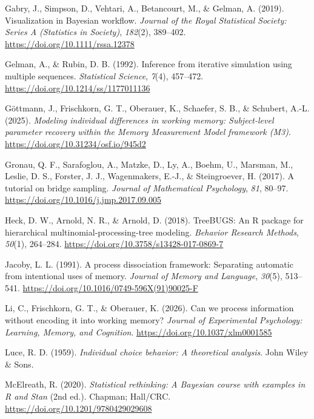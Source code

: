 \documentclass[
  man,
  floatsintext,
  longtable,
  nolmodern,
  notxfonts,
  notimes,
  colorlinks=true,linkcolor=blue,citecolor=blue,urlcolor=blue]{apa7}
\newlength{\cslhangindent}
\newenvironment{CSLReferences}[2] %
 {\begin{list}{}{%
  \setlength{\itemindent}{0pt}
  \setlength{\leftmargin}{0pt}
  \setlength{\parsep}{0pt}
  \ifodd #1
   \setlength{\leftmargin}{\cslhangindent}
   \setlength{\itemindent}{-1\cslhangindent}
  \fi
  \setlength{\itemsep}{#2\baselineskip}}}
 {\end{list}}
\begin{document}
\begin{CSLReferences}{1}{0}
Gabry, J., Simpson, D., Vehtari, A., Betancourt, M., \& Gelman, A.
(2019). Visualization in {B}ayesian workflow. \emph{Journal of the Royal
Statistical Society: Series A (Statistics in Society)}, \emph{182}(2),
389--402. \url{https://doi.org/10.1111/rssa.12378}

Gelman, A., \& Rubin, D. B. (1992). Inference from iterative simulation
using multiple sequences. \emph{Statistical Science}, \emph{7}(4),
457--472. \url{https://doi.org/10.1214/ss/1177011136}

Göttmann, J., Frischkorn, G. T., Oberauer, K., Schaefer, S. B., \&
Schubert, A.-L. (2025). \emph{Modeling individual differences in working
memory: {S}ubject-level parameter recovery within the {M}emory
{M}easurement {M}odel framework ({M3})}.
\url{https://doi.org/10.31234/osf.io/945d2}

Gronau, Q. F., Sarafoglou, A., Matzke, D., Ly, A., Boehm, U., Marsman,
M., Leslie, D. S., Forster, J. J., Wagenmakers, E.-J., \& Steingroever,
H. (2017). A tutorial on bridge sampling. \emph{Journal of Mathematical
Psychology}, \emph{81}, 80--97.
\url{https://doi.org/10.1016/j.jmp.2017.09.005}

Heck, D. W., Arnold, N. R., \& Arnold, D. (2018). {TreeBUGS}: {A}n {R}
package for hierarchical multinomial-processing-tree modeling.
\emph{Behavior Research Methods}, \emph{50}(1), 264--284.
\url{https://doi.org/10.3758/s13428-017-0869-7}

Jacoby, L. L. (1991). A process dissociation framework: Separating
automatic from intentional uses of memory. \emph{Journal of Memory and
Language}, \emph{30}(5), 513--541.
\url{https://doi.org/10.1016/0749-596X(91)90025-F}

Li, C., Frischkorn, G. T., \& Oberauer, K. (2026). Can we process
information without encoding it into working memory? \emph{Journal of
Experimental Psychology: Learning, Memory, and Cognition}.
\url{https://doi.org/10.1037/xlm0001585}

Luce, R. D. (1959). \emph{Individual choice behavior: {A} theoretical
analysis}. John Wiley \& Sons.

McElreath, R. (2020). \emph{Statistical rethinking: {A} {B}ayesian
course with examples in {R} and {S}tan} (2nd ed.). Chapman; Hall/CRC.
\url{https://doi.org/10.1201/9780429029608}


\end{CSLReferences}
\end{document}
